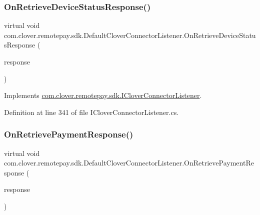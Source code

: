 \subsubsection{\texorpdfstring{On\+Retrieve\+Device\+Status\+Response()}{OnRetrieveDeviceStatusResponse()}}
{\footnotesize\ttfamily virtual void com.\+clover.\+remotepay.\+sdk.\+Default\+Clover\+Connector\+Listener.\+On\+Retrieve\+Device\+Status\+Response (\begin{DoxyParamCaption}\item[{\hyperlink{classcom_1_1clover_1_1remotepay_1_1sdk_1_1_retrieve_device_status_response}{Retrieve\+Device\+Status\+Response}}]{response }\end{DoxyParamCaption})\hspace{0.3cm}{\ttfamily [virtual]}}



Implements \hyperlink{interfacecom_1_1clover_1_1remotepay_1_1sdk_1_1_i_clover_connector_listener_a2ce59dcc916f95bcb88f9e25deccd92f}{com.\+clover.\+remotepay.\+sdk.\+I\+Clover\+Connector\+Listener}.



Definition at line 341 of file I\+Clover\+Connector\+Listener.\+cs.

\mbox{\label{classcom_1_1clover_1_1remotepay_1_1sdk_1_1_default_clover_connector_listener_a275810025eccbd5cc81fe48752fa8872}} 
\subsubsection{\texorpdfstring{On\+Retrieve\+Payment\+Response()}{OnRetrievePaymentResponse()}}
{\footnotesize\ttfamily virtual void com.\+clover.\+remotepay.\+sdk.\+Default\+Clover\+Connector\+Listener.\+On\+Retrieve\+Payment\+Response (\begin{DoxyParamCaption}\item[{\hyperlink{classcom_1_1clover_1_1remotepay_1_1sdk_1_1_retrieve_payment_response}{Retrieve\+Payment\+Response}}]{response }\end{DoxyParamCaption})\hspace{0.3cm}{\ttfamily [virtual]}}



